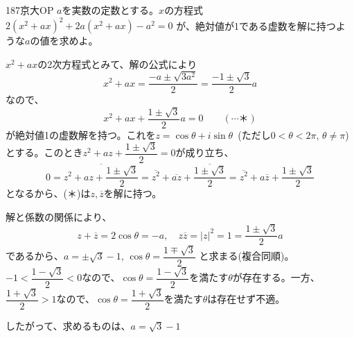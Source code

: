 \begin{thm}{187}{}{京大OP}
 $a$を実数の定数とする。$x$の方程式 $2(x^2+ax)^2+2a(x^2+ax)-a^2=0$ が、絶対値が1である虚数を解に持つような$a$の値を求めよ。
\end{thm}

$x^2+ax$の2次方程式とみて、解の公式により
\[ x^2+ax=\frac{-a\pm\sqrt{3a^2}}{2}=\frac{-1\pm\sqrt{3}}{2}a \]
なので、
\[ x^2+ax+\frac{1\pm\sqrt{3}}{2}a=0 \qquad (\cdots \text{＊}) \]
が絶対値1の虚数解を持つ。これを$z=\cos\theta+i\sin\theta$~(ただし$0<\theta<2\pi$, $\theta\neq\pi$)とする。このとき$z^2+az+\dfrac{1\pm\sqrt{3}}{2}=0$が成り立ち、
\[ 0=\overline{z^2+az+\frac{1\pm\sqrt{3}}{2}}=\overline{z^2}+\overline{az}+\overline{\frac{1\pm\sqrt{3}}{2}}=\overline{z^2}+a\overline{z}+\frac{1\pm\sqrt{3}}{2} \]
となるから、(＊)は$z, \overline{z}$を解に持つ。

解と係数の関係により、
\[ z+\overline{z}=2\cos\theta=-a,\quad z\overline{z}=|z|^2=1=\frac{1\pm\sqrt{3}}{2}a \]
であるから、$a=\pm\sqrt{3}-1$, $\cos\theta=\dfrac{1\mp\sqrt{3}}{2}$ と求まる(複合同順)。$-1<\dfrac{1-\sqrt{3}}{2}<0$なので、$\cos\theta=\dfrac{1-\sqrt{3}}{2}$を満たす$\theta$が存在する。一方、$\dfrac{1+\sqrt{3}}{2}>1$なので、$\cos\theta=\dfrac{1+\sqrt{3}}{2}$を満たす$\theta$は存在せず不適。

したがって、求めるものは、$a=\sqrt{3}-1$